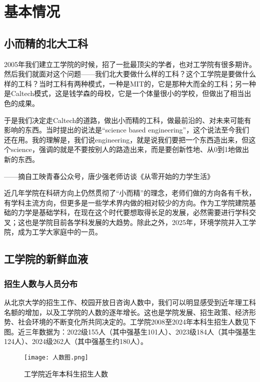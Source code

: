 \documentclass[11pt,oneside]{book}
\begin{document}
\tableofcontents

\mainmatter
	
\chapter{基本情况}
\section{小而精的北大工科}
2005年我们建立工学院的时候，招了一批最顶尖的学者，也对工学院有很多期许。然后我们就面对这个问题——我们北大要做什么样的工科？这个工学院是要做什么样的工科？当时工科有两种模式，一种是MIT的，它是那种大而全的工科；另一种是Caltech模式，这是钱学森的母校，它是一个体量很小的学校，但做出了相当出色的成果。

于是我们决定走Caltech的道路，做出小而精的工科，做最前沿的、对未来可能有影响的东西。当时提出的说法是“science based engineering”，这个说法至今我们还在用。我的理解是，我们说engineering，就是说我们要把一个东西造出来，但这个science，强调的就是不要按别人的路造出来，而是要创新性地、从0到1地做出新的东西。
\begin{flushright}
	——摘自工映青春公众号，唐少强老师访谈《从零开始的力学生活》

\end{flushright}

\vspace{10pt}

近几年学院在科研方向上仍然贯彻了“小而精”的理念，老师们做的方向各有千秋，有学科主流方向，但更多是一些学术界内做的相对较少的方向。作为工学院建院基础的力学是基础学科，在现在这个时代要想取得长足的发展，必然需要进行学科交叉；这也是学院目前各学科发展的大趋势。除此之外，2025年，环境学院并入工学院，成为工学大家庭中的一员。

\section{工学院的新鲜血液}    
\subsection{招生人数与人员分布}
从北京大学的招生工作、校园开放日咨询人数中，我们可以明显感受到近年理工科名额的增加，以及工学院的人数的逐年增长。这也是学院发展、招生政策、经济形势、社会环境的不断变化所共同决定的。工学院2008至2024年本科生招生人数见下图。近三年数据为：2022级155人（其中强基生101人）、2023级184人（其中强基生124人）、2024级262人（其中强基生约180人）。

\begin{figure}[H]
	\centering
	\texttt{[image: 人数图.png]} %
	\renewcommand{\figurename}{图}
	\caption{工学院近年本科生招生人数}
	\label{fig:enter-label}
\end{figure}
\end{document}
